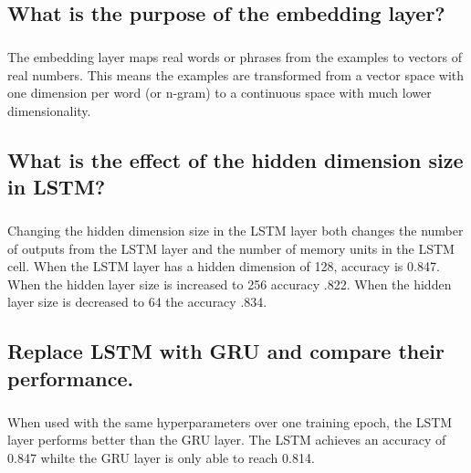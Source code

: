 \documentclass[11pt]{article}
\begin{document}
\subsection{What is the purpose of the embedding layer?}

\subparagraph{}

The embedding layer maps real words or phrases from the examples to vectors of real numbers. This means the examples are transformed from a vector space with one dimension per word (or n-gram) to a continuous space with much lower dimensionality.

\subsection{What is the effect of the hidden dimension size in LSTM?}

\subparagraph{}

Changing the hidden dimension size in the LSTM layer both changes the number of outputs from the LSTM layer and the number of memory units in the LSTM cell. When the LSTM layer has a hidden dimension of 128, accuracy is 0.847. When the hidden layer size is increased to 256 accuracy .822. When the hidden layer size is decreased to 64 the accuracy .834. 

\subsection{Replace LSTM with GRU and compare their performance.}

\subparagraph{}

When used with the same hyperparameters over one training epoch, the LSTM layer performs better than the GRU layer. The LSTM achieves an accuracy of 0.847 whilte the GRU layer is only able to reach 0.814. 
\end{document}
